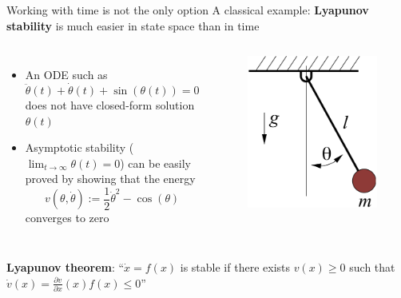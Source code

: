 \documentclass[aspectratio=169]{beamer}
\begin{document}
\begin{frame}{Working with time is not the only option}
A classical example: \textbf{Lyapunov stability} is much easier in state space than in time
\begin{columns}
\begin{itemize}
\item
An ODE such as
$$
\ddot \theta(t) + \dot \theta(t) + \sin(\theta(t)) = 0
$$
does not have closed-form solution $\theta(t)$
\item
Asymptotic stability ($\lim_{t \rightarrow \infty} \theta(t) = 0$) can be easily proved by showing that the energy
$$
v(\theta, \dot \theta) := \frac{1}{2} \dot \theta^2 - \cos(\theta)
$$
converges to zero
\end{itemize}
\begin{figure}[h]
\includegraphics[width=\columnwidth]{figures/simple_pend.png}
\end{figure}
\end{columns}
\textbf{Lyapunov theorem}: ``$\dot x = f(x)$ is stable if there exists $v(x) \geq 0$ such that $\dot v(x) = \frac{\partial v}{\partial x} (x) f(x) \leq 0$''
\end{frame}
\end{document}
